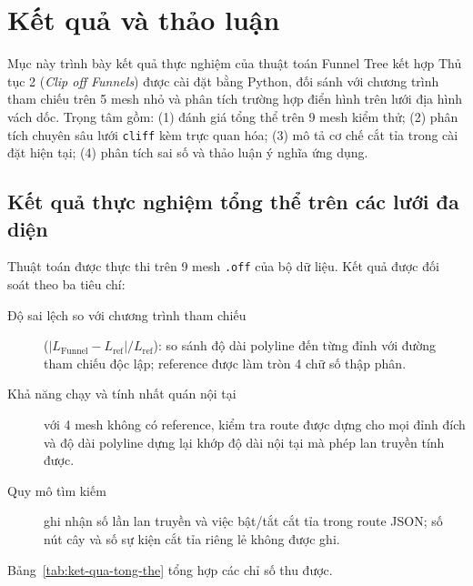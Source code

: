 
\section{Kết quả và thảo luận}\label{sec:results}

Mục này trình bày kết quả thực nghiệm của thuật toán Funnel Tree kết hợp Thủ tục 2
(\emph{Clip off Funnels}) được cài đặt bằng Python, đối sánh với chương trình
tham chiếu trên 5 mesh nhỏ và phân tích trường hợp điển hình trên lưới địa hình
vách dốc. Trọng tâm gồm: (1) đánh giá tổng thể trên 9 mesh kiểm thử; (2) phân
tích chuyên sâu lưới \texttt{cliff} kèm trực quan hóa; (3) mô tả cơ chế cắt tỉa
trong cài đặt hiện tại; (4) phân tích sai số và thảo luận ý nghĩa ứng dụng.

\subsection{Kết quả thực nghiệm tổng thể trên các lưới đa diện}

Thuật toán được thực thi trên 9 mesh \texttt{.off} của bộ dữ liệu. Kết quả được đối soát theo ba tiêu chí:
\begin{description}
  \item[Độ sai lệch so với chương trình tham chiếu]
    ($|L_{\text{Funnel}}-L_{\text{ref}}|/L_{\text{ref}}$): so sánh độ dài polyline
    đến từng đỉnh với đường tham chiếu độc lập; reference được làm tròn 4 chữ số
    thập phân.
  \item[Khả năng chạy và tính nhất quán nội tại] với 4 mesh không có reference,
    kiểm tra route được dựng cho mọi đỉnh đích và độ dài polyline dựng lại khớp
    độ dài nội tại mà phép lan truyền tính được.
  \item[Quy mô tìm kiếm] ghi nhận số lần lan truyền và việc bật/tắt cắt tỉa
    trong route JSON; số nút cây và số sự kiện cắt tỉa riêng lẻ không được ghi.
\end{description}
Bảng~\ref{tab:ket-qua-tong-the} tổng hợp các chỉ số thu được.

